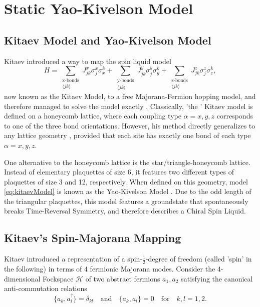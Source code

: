 \documentclass[%
fontsize=12pt, %
twoside=off %
]{scrbook}
\begin{document}
\chapter{Static Yao-Kivelson Model}
\section{Kitaev Model and Yao-Kivelson Model}
Kitaev introduced a way to map the spin liquid model
\begin{equation}
H = \sum_{\substack{\text{x-bonds} \\ \langle jk\rangle }} J^x_{jk} \sigma^x_j\sigma_x^k
+\sum_{\substack{\text{y-bonds} \\ \langle jk\rangle }} J^y_{jk} \sigma^y_j\sigma_y^k
+\sum_{\substack{\text{z-bonds} \\ \langle jk\rangle }} J^z_{jk} \sigma^z_j\sigma_z^k,
\label{eq:kitaevModel}
\end{equation}
now known as the Kitaev Model, to a free Majorana-Fermion hopping model, and therefore managed to solve the model exactly  \cite{kitaev_2006}. Classically, 'the ' Kitaev model is defined on a honeycomb lattice, where each coupling type $\alpha =x,y,z$ corresponds to one of the three bond orientations. However, his method directly generalizes to any lattice geometry \cite{reuther_2026}, provided that each site has exactly one bond of each type $\alpha = x,y,z$.

One alternative to the honeycomb lattice is the star/triangle-honeycomb lattice. Instead of elementary plaquettes of size 6, it features two different types of plaquettes of size 3 and 12, respectively. When defined on this geometry, model \ref{eq:kitaevModel} is known as the Yao-Kivelson Model \cite{yao_2007}. Due to the odd length of the triangular plaquettes, this model features a groundstate that spontaneously breaks Time-Reversal Symmetry, and therefore describes a Chiral Spin Liquid. 
\section{Kitaev's Spin-Majorana Mapping}
Kitaev introduced a representation of a spin-$\frac{1}{2}$-degree of freedom (called 'spin' in the following) in terms of 4 fermionic Majorana modes. Consider the 4-dimensional Fockspace $\mathcal{H}$ of two abstract fermions $a_1,a_2$ satisfying the canonical anti-commutation relations
\begin{equation}
	\Big\{a_k,a_l^\dagger\Big\}=\delta_{kl}\quad\text{and}\quad \Big\{a_k,a_l\Big\}=0\quad\text{for}\quad k,l=1,2.
\end{equation}
\end{document}

